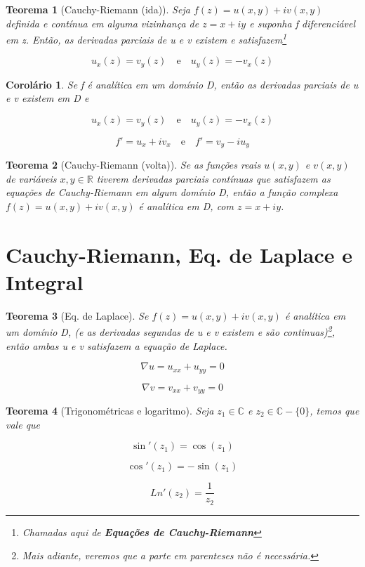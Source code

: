 \documentclass{article}
\newtheorem{theorem}{Teorema}
\newtheorem{corollary}{Corolário}[theorem]
\begin{document}
\begin{theorem}[Cauchy-Riemann (ida)]
Seja $f(z) = u(x, y) + i v(x, y)$ definida e contínua em alguma vizinhança de $z = x + i y$ e suponha f diferenciável em z. Então, as derivadas parciais de u e v existem e satisfazem\footnote{Chamadas aqui de \textbf{Equações de Cauchy-Riemann}}

$$u_x(z) = v_y(z)\quad\text{e}\quad u_y(z) = - v_x(z)$$
\end{theorem}

\begin{corollary}
Se f é analítica em um domínio D, então as derivadas parciais de u e v existem em D e

$$u_x(z) = v_y(z)\quad \text{e} \quad u_y(z) = - v_x(z)$$

$$f' = u_x + i v_x\quad \text{e} \quad f' = v_y - i u_y$$
\end{corollary}

\begin{theorem}[Cauchy-Riemann (volta)]
Se as funções reais $u(x, y)$ e $v(x, y)$ de variáveis $x, y \in \mathbb{R}$ tiverem derivadas parciais contínuas que satisfazem as equações de Cauchy-Riemann em algum domínio D, então a função complexa $f(z) = u(x, y) + i v(x, y)$ é analítica em D, com $z = x + iy$.
\end{theorem}

\section*{Cauchy-Riemann, Eq. de Laplace e Integral}
\label{s4}
\begin{theorem}[Eq. de Laplace]
Se $f(z) = u(x, y) + i v(x, y)$ é analítica em um domínio D, (e as derivadas segundas de u e v existem e são continuas)\footnote{Mais adiante, veremos que a parte em parenteses não é necessária.}, então ambas u e v satisfazem a equação de Laplace.

$$\nabla u = u_{xx} + u_{yy} = 0$$

$$\nabla v = v_{xx} + v_{yy} = 0$$
\end{theorem}

\begin{theorem}[Trigonométricas e logaritmo]
Seja $z_1 \in \mathbb{C}$ e $z_2 \in \mathbb{C} - \{ 0 \}$, temos que vale que

$$\sin'(z_1) = \cos(z_1)$$

$$\cos'(z_1) = - \sin(z_1)$$

$$Ln'(z_2) = \frac{1}{z_2}$$
\end{theorem}
\end{document}
